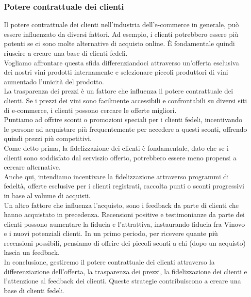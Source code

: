 \documentclass[12pt, a4paper]{article}
\newcommand{\meskip}{\medskip \\}
\newcommand{\bskip}{\bigskip \\}
\begin{document}
\subsubsection{Potere contrattuale dei clienti}
Il potere contrattuale dei clienti nell'industria dell'e-commerce in generale, può essere influenzato da diversi fattori. Ad esempio, i clienti potrebbero essere più potenti se ci sono molte alternative di acquisto online. È fondamentale quindi riuscire a creare una base di clienti fedeli.\\
Vogliamo affrontare questa sfida differenziandoci attraverso un'offerta esclusiva dei nostri vini prodotti internamente e selezionare piccoli produttori di vini aumentado l'unicità del prodotto.\meskip
La trasparenza dei prezzi è un fattore che influenza il potere contrattuale dei clienti. Se i prezzi dei vini sono facilmente accessibili e confrontabili su diversi siti di e-commerce, i clienti possono cercare le offerte migliori.\\
Puntiamo ad offrire sconti o promozioni speciali per i clienti fedeli, incentivando le persone ad acquistare più frequentemente per accedere a questi sconti, offrendo quindi prezzi più competitivi.\meskip
Come detto prima, la fidelizzazione dei clienti è fondamentale, dato che se i clienti sono soddisfato dal serviszio offerto, potrebbero essere meno propensi a cercare alternative.\\
Anche qui, intendiamo incentivare la fidelizzazione attraverso programmi di fedeltà, offerte esclusive per i clienti registrati, raccolta punti o sconti progressivi in base al volume di acquisti.\meskip
Un altro fattore che influenza l'acquisto, sono i feedback da parte di clienti che hanno acquistato in precedenza.
Recensioni positive e testimonianze da parte dei clienti possono aumentare la fiducia e l'attrattiva, instaurando fiducia fra Vinovo e i nuovi potenziali clienti. In un primo periodo, per ricevere quante più recensioni possibili, pensiamo di offrire dei piccoli sconti a chi (dopo un acquisto) lascia un feedback.\bskip
In conclusione, gestiremo il potere contrattuale dei clienti attraverso la differenziazione dell'offerta, la trasparenza dei prezzi, la fidelizzazione dei clienti e l'attenzione al feedback dei clienti. Queste strategie contribuiscono a creare una base di clienti fedeli.
\end{document}
